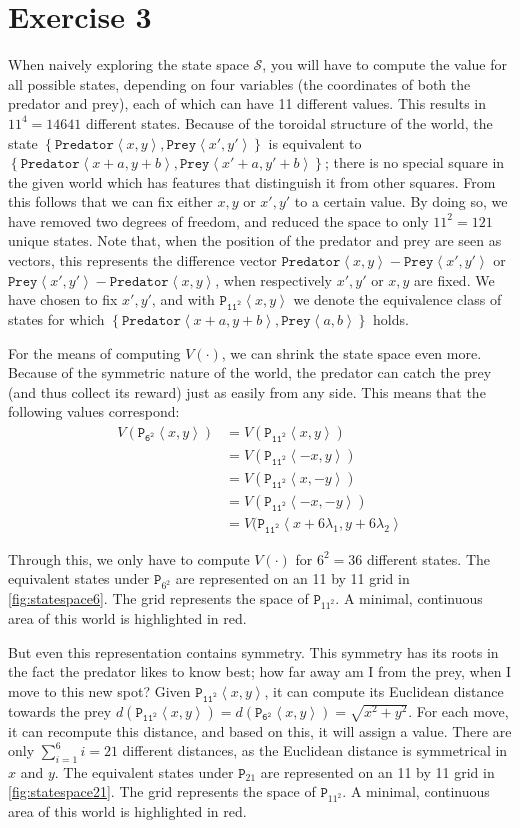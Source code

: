 \documentclass[a4paper,11pt]{article}
\newcommand{\Pred}[2]{\ensuremath{\mathtt{Predator}\left<#1, #2\right>}}
\newcommand{\Prey}[2]{\ensuremath{\mathtt{Prey}\left<#1, #2\right>}}
\newcommand{\p}[2]{\ensuremath{\mathtt{P_{11^2}}\left<#1, #2\right>}}
\newcommand{\pSW}[2]{\ensuremath{\mathtt{P_{6^2}}\left<#1, #2\right>}}
\begin{document}
\section*{Exercise 3}
When naively exploring the state space $\mathcal{S}$, you will have to compute the value for all possible states, depending on four variables (the coordinates of both the predator and prey), each of which can have 11 different values.  This results in $11^4 = 14641$ different states.  Because of the toroidal structure of the world, the state $\left\{\Pred{x}{y}, \Prey{x'}{y'}\right\}$ is equivalent to $\left\{\Pred{x+a}{y+b}, \Prey{x'+a}{y'+b}\right\}$; there is no special square in the given world which has features that distinguish it from other squares.  From this follows that we can fix either $x, y$ or $x', y'$ to a certain value.  By doing so, we have removed two degrees of freedom, and reduced the space to only $11^2 = 121$ unique states.  Note that, when the position of the predator and prey are seen as vectors, this represents the difference vector $\Pred{x}{y} - \Prey{x'}{y'}$ or $\Prey{x'}{y'} - \Pred{x}{y}$, when respectively $x', y'$ or $x, y$ are fixed.  We have chosen to fix $x', y'$, and with $\p{x}{y}$ we denote the equivalence class of states for which $\left\{\Pred{x+a}{y+b}, \Prey{a}{b}\right\}$ holds.

For the means of computing $V(\cdot)$, we can shrink the state space even more.  Because of the symmetric nature of the world, the predator can catch the prey (and thus collect its reward) just as easily from any side.  This means that the following values correspond:
\begin{align*}
V(\pSW{x}{y})
  &= V(\p{x}{y}) \\
  &= V(\p{-x}{y}) \\
  &= V(\p{x}{-y}) \\
  &= V(\p{-x}{-y}) \\
  &= V(\p{x + 6 \lambda_1}{y + 6 \lambda_2}
\end{align*}

Through this, we only have to compute $V(\cdot)$ for $6^2 = 36$ different states.  The equivalent states under $\mathtt{P}_{6^2}$ are represented on an 11 by 11 grid in \autoref{fig:statespace6}.  The grid represents the space of $\mathtt{P}_{11^2}$.  A minimal, continuous area of this world is highlighted in red.

But even this representation contains symmetry.  This symmetry has its roots in the fact the predator likes to know best; how far away am I from the prey, when I move to this new spot?  Given $\p{x}{y}$, it can compute its Euclidean distance towards the prey $d(\p{x}{y}) = d(\pSW{x}{y}) = \sqrt{x^2+y^2}$.  For each move, it can recompute this distance, and based on this, it will assign a value.  There are only $\sum_{i=1}^{6} i = 21$ different distances, as the Euclidean distance is symmetrical in $x$ and $y$.  The equivalent states under $\mathtt{P}_{21}$ are represented on an 11 by 11 grid in \autoref{fig:statespace21}.  The grid represents the space of $\mathtt{P}_{11^2}$.  A minimal, continuous area of this world is highlighted in red.
\end{document}

